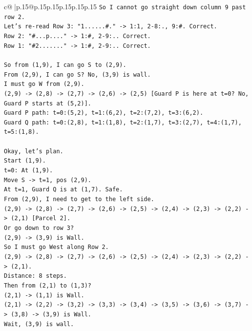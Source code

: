 \documentclass{article}
\begin{document}
{\begin{supertabular}{c@{$\;$}|p{.15\linewidth}@{}p{.15\linewidth}p{.15\linewidth}p{.15\linewidth}p{.15\linewidth}p{.15\linewidth}}
{{{\texttt{So I cannot go straight down column 9 past row 2.} \\
\texttt{Let's re{-}read Row 3: "1......\#." {-}> 1:1, 2{-}8:., 9:\#. Correct.} \\
\texttt{Row 2: "\#...p...." {-}> 1:\#, 2{-}9:.. Correct.} \\
\texttt{Row 1: "\#2......." {-}> 1:\#, 2{-}9:.. Correct.} \\
\\ 
\texttt{So from (1,9), I can go S to (2,9).} \\
\texttt{From (2,9), I can go S? No, (3,9) is wall.} \\
\texttt{I must go W from (2,9).} \\
\texttt{(2,9) {-}> (2,8) {-}> (2,7) {-}> (2,6) {-}> (2,5) {[}Guard P is here at t=0? No, Guard P starts at (5,2){]}.} \\
\texttt{Guard P path: t=0:(5,2), t=1:(6,2), t=2:(7,2), t=3:(6,2).} \\
\texttt{Guard Q path: t=0:(2,8), t=1:(1,8), t=2:(1,7), t=3:(2,7), t=4:(1,7), t=5:(1,8).} \\
\\ 
\texttt{Okay, let's plan.} \\
\texttt{Start (1,9).} \\
\texttt{t=0: At (1,9).} \\
\texttt{Move S {-}> t=1, pos (2,9).} \\
\texttt{At t=1, Guard Q is at (1,7). Safe.} \\
\texttt{From (2,9), I need to get to the left side.} \\
\texttt{(2,9) {-}> (2,8) {-}> (2,7) {-}> (2,6) {-}> (2,5) {-}> (2,4) {-}> (2,3) {-}> (2,2) {-}> (2,1) {[}Parcel 2{]}.} \\
\texttt{Or go down to row 3?} \\
\texttt{(2,9) {-}> (3,9) is Wall.} \\
\texttt{So I must go West along Row 2.} \\
\texttt{(2,9) {-}> (2,8) {-}> (2,7) {-}> (2,6) {-}> (2,5) {-}> (2,4) {-}> (2,3) {-}> (2,2) {-}> (2,1).} \\
\texttt{Distance: 8 steps.} \\
\texttt{Then from (2,1) to (1,3)?} \\
\texttt{(2,1) {-}> (1,1) is Wall.} \\
\texttt{(2,1) {-}> (2,2) {-}> (3,2) {-}> (3,3) {-}> (3,4) {-}> (3,5) {-}> (3,6) {-}> (3,7) {-}> (3,8) {-}> (3,9) is Wall.} \\
\texttt{Wait, (3,9) is wall.} \\
}}}
\end{supertabular}}
\end{document}
